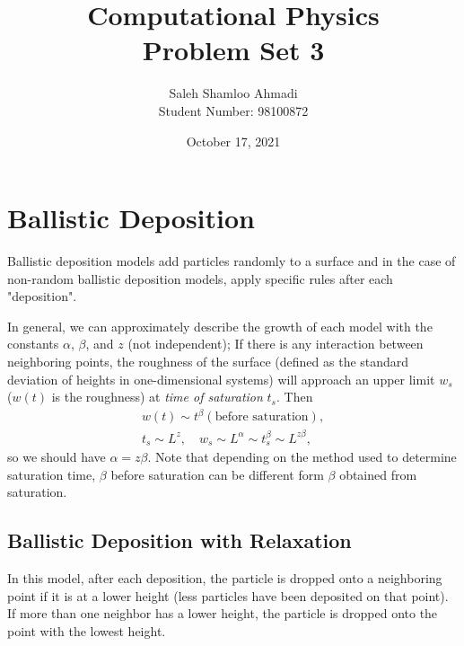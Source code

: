 \documentclass[12pt,a4paper]{article}
\title{Computational Physics\\Problem Set 3}
\author{Saleh Shamloo Ahmadi\\Student Number: 98100872}
\date{October 17, 2021}
\begin{document}
	\maketitle
    \section{Ballistic Deposition}
    Ballistic deposition models add particles randomly to a surface and in the case of non-random
    ballistic deposition models, apply specific rules after each "deposition".

    In general, we can approximately describe the growth of each model with the constants $\alpha$, $\beta$,
    and $z$ (not independent); If there is any interaction between neighboring points, the roughness of the
    surface (defined as the standard deviation of heights in one-dimensional systems) will approach an upper limit
    $w_s$ ($w(t)$ is the roughness) at \emph{time of saturation} $t_s$. Then
    \begin{gather}
        w(t) \sim t^\beta (\text{before saturation}), \\
        t_s \sim L^z, \quad w_s \sim L^\alpha \sim t_s^\beta \sim L^{z\beta},
    \end{gather}
    so we should have $\alpha = z\beta$. Note that depending on the method used to determine saturation time, $\beta$
    before saturation can be different form $\beta$ obtained from saturation.

    \subsection{Ballistic Deposition with Relaxation}
    In this model, after each deposition, the particle is dropped onto a neighboring point if it is at a lower height
    (less particles have been deposited on that point). If more than one neighbor has a lower height, the particle is
    dropped onto the point with the lowest height.
\end{document}
